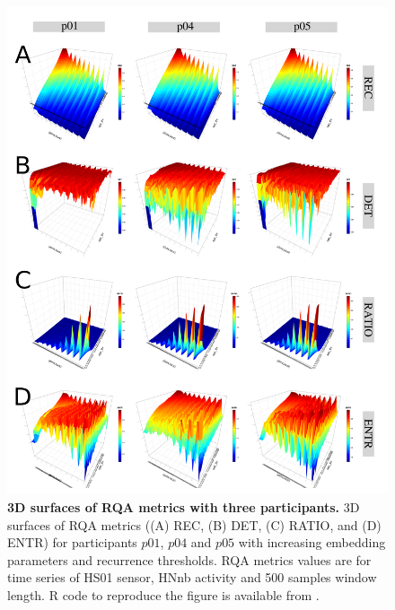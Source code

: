 \begin{figure}[!ht]
\centering
\includegraphics[width=1.0\textwidth]{participants_w500}
    \caption{
	{\bf 3D surfaces of RQA metrics with three participants.}
	3D surfaces of RQA metrics ((A) REC, (B) DET, (C) RATIO, and (D) ENTR) 
	for participants $p01$, $p04$ and $p05$ with increasing embedding 
	parameters and recurrence thresholds.
	RQA metrics values are for time series of HS01 sensor, 
	HNnb activity and 500 samples window length.
	R code to reproduce the figure is available from \cite{hwum2018}.
 }
\label{fig:topo_participants_hii}
\end{figure}



